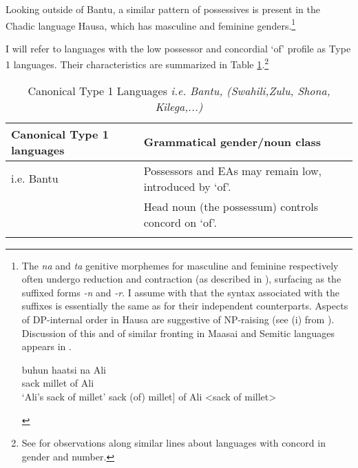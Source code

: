 \documentclass[output=paper
,modfonts
,nonflat]{langsci/langscibook}
\begin{document}
Looking outside of Bantu, a similar pattern of possessives is present in the Chadic language Hausa, which has masculine and feminine genders.\footnote{The \textit{na} and \textit{ta} genitive morphemes for masculine and feminine respectively often undergo reduction and contraction (as described in \citealt{Tuller1986}), surfacing as the suffixed forms \textit{-n} and \textit{-r}. I assume with \citet{Tuller1986} that the syntax associated with the suffixes is essentially the same as for their independent counterparts. Aspects of DP-internal order in Hausa are suggestive of NP-raising (see (i) from \citealt[30]{Tuller1986}). Discussion of this and of similar fronting in Maasai and Semitic languages appears in .
\begin{exe}
	\ex 
	\xlist
	\ex 
	\gll buhun haatsi na Ali\\
	sack     millet  of Ali\\
	\glt `Ali's sack of millet'  	
	\ex {[}sack (of) millet{]} of Ali <sack of millet>
	
	\endxlist
\end{exe}}

I will refer to languages with the low possessor and concordial `of' profile as Type 1 languages. Their characteristics are summarized in Table \ref{tab-carstens:1}.\footnote{See \citet{Giusti2008} for observations along similar lines about languages with concord in gender and number.} 

\begin{table}
	\caption{Canonical Type 1 Languages \textit{i.e. Bantu, (Swahili,Zulu, Shona, Kilega,...)}}
	\label{tab-carstens:1}
	\begin{tabularx}{\textwidth}{lX}
		\lsptoprule
		Canonical Type 1 languages & Grammatical gender/noun class\\\midrule
		i.e. Bantu          & Possessors and EAs may remain low, introduced by ‘of’.\\
                            & Head noun (the possessum) controls concord on ‘of’.\\
		\lspbottomrule
	\end{tabularx}
\end{table}  
\end{document}
